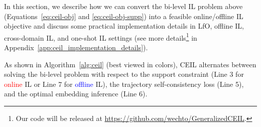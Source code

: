 In this section, we describe how we can convert the bi-level IL problem above (Equations~\ref{eq:ceil-obj} and \ref{eq:ceil-obj-supp}) into a feasible online/offline IL objective and discuss some practical implementation details in LfO, offline IL, cross-domain IL, and one-shot IL settings ({see more details\footnote{Our code will be released at \url{https://github.com/wechto/GeneralizedCEIL}.}} in Appendix~\ref{app:ceil_implementation_details}). %


As shown in Algorithm~\ref{alg:ceil} (best viewed in colors), CEIL alternates between solving the bi-level problem with respect to the support constraint (Line 3 for \textcolor{red}{online} IL or Line 7 for \textcolor{blue}{offline} IL), the trajectory self-consistency loss (Line 5), and the optimal embedding inference (Line 6). 


